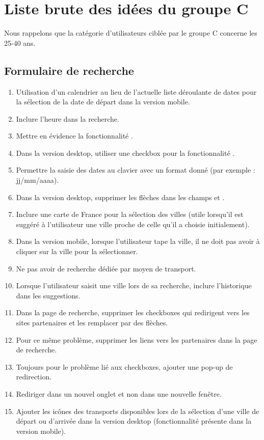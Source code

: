 \section{Liste brute des id\'{e}es du groupe C}

Nous rappelons que la cat\'{e}gorie d'utilisateurs cibl\'{e}e par le groupe C concerne les 25-40 ans.


\subsection{Formulaire de recherche}

\begin{enumerate}
\item Utilisation d'un calendrier au lieu de l'actuelle liste d\'{e}roulante de dates pour la s\'{e}lection de la date de d\'{e}part dans la version mobile.
\item Inclure l'heure dans la recherche.
\item Mettre en \'{e}vidence la fonctionnalit\'{e} .
\item Dans la version desktop, utiliser une checkbox pour la fonctionnalit\'{e} .
\item Permettre la saisie des dates au clavier avec un format donn\'{e} (par exemple : jj/mm/aaaa).
\item Dans la version desktop, supprimer les fl\`{e}ches dans les champs  et .
\item Inclure une carte de France pour la s\'{e}lection des villes (utile lorsqu'il est sugg\'{e}r\'{e} \`{a} l'utilisateur une ville proche de celle qu'il a choisie initialement).
\item Dans la version mobile, lorsque l'utilisateur tape la ville, il ne doit pas avoir \`{a} cliquer sur la ville pour la s\'{e}lectionner.
\item Ne pas avoir de recherche d\'{e}di\'{e}e par moyen de transport.
\item Lorsque l'utilisateur saisit une ville lors de sa recherche, inclure l'historique dans les suggestions.
\item Dans la page de recherche, supprimer les checkboxes qui redirigent vers les sites partenaires et les remplacer par des fl\`{e}ches.
\item Pour ce m\^{e}me probl\`{e}me, supprimer les liens vers les partenaires dans la page de recherche.
\item Toujours pour le probl\`{e}me li\'{e} aux checkboxes, ajouter une pop-up de redirection.
\item Rediriger dans un nouvel onglet et non dans une nouvelle fen\^{e}tre.
\item Ajouter les ic\^{o}nes des transports disponibles lors de la s\'{e}lection d'une ville de d\'{e}part ou d'arriv\'{e}e dans la version desktop (fonctionnalit\'{e} pr\'{e}sente dans la version mobile).
\end{enumerate}

